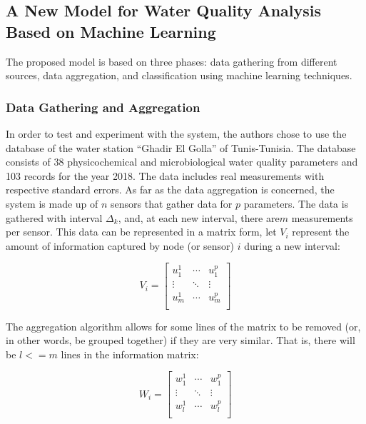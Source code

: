 \documentclass[draft, {\secondLanguage}, english]{volcanica-template}
\begin{document}
\subsection{A New Model for Water Quality Analysis Based on Machine Learning}
The proposed model is based on three phases: data gathering from different sources, data aggregation, and classification using machine learning techniques.
\subsubsection{Data Gathering and Aggregation}
In order to test and experiment with the system, the authors chose to use the database of the water station “Ghadir El Golla” of Tunis-Tunisia. The database consists of 38 physicochemical and microbiological water quality parameters and 103 records for the year 2018. The data includes real measurements with respective standard errors.
As far as the data aggregation is concerned, the system is made up of $n$ sensors that gather data for $p$ parameters. The data is gathered with interval $\Delta_k$, and, at each new interval, there are$m$ measurements per sensor. This data can be represented in a matrix form, let $V_i$ represent the amount of information captured by node (or sensor) $i$ during a new interval: 

\begin{equation}
    V_i = 
        \begin{bmatrix}
        u_1^1 & \cdots & u_1^p \\
        \vdots & \ddots & \vdots \\
        u_m^1 & \cdots & u_m^p \\
        \end{bmatrix}
\end{equation}

The aggregation algorithm allows for some lines of the matrix to be removed (or, in other words, be grouped together) if they are very similar. That is, there will be $l <= m$ lines in the information matrix:

\begin{equation}
    W_i = 
        \begin{bmatrix}
        w_1^1 & \cdots & w_1^p \\
        \vdots & \ddots & \vdots \\
        w_l^1 & \cdots & w_l^p \\
        \end{bmatrix}
\end{equation}
\end{document}
